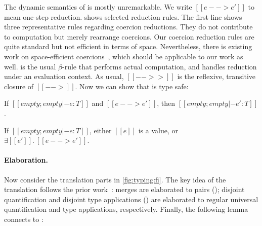 The dynamic semantics of \tnamee is mostly unremarkable. We write $[[e --> e']]$
to mean one-step reduction.  shows selected reduction
rules. The first line shows three representative rules regarding coercion reductions.
They do not contribute to computation but merely rearrange coercions.
Our coercion reduction rules are quite standard but not efficient in terms of
space. Nevertheless, there is existing work on space-efficient
coercions~\citep{Siek_2015, herman2010space}, which should be applicable to our
work as well.  is the usual $\beta$-rule that performs actual
computation, and  handles reduction under an evaluation context.
As usual, $[[-->>]]$ is the reflexive, transitive closure of $[[-->]]$.
Now we can show that \tnamee is type safe:

\begin{theorem}[Preservation]
  If $[[empty; empty |- e : T]]$ and $[[e --> e']]$, then $[[empty; empty |- e' : T]]$.
\end{theorem}

\begin{theorem}[Progress]
  If $[[empty; empty |- e : T]]$, either $[[e]]$ is a value, or $\exists [[e']].\ [[e --> e']]$.
\end{theorem}


\paragraph{Elaboration.}

Now consider the translation parts in \cref{fig:typing:fi}. The key idea of
the translation follows the prior work~\cite{dunfield2014elaborating, oliveira2016disjoint,
  alpuimdisjoint, bi_et_al:LIPIcs:2018:9227}: merges are elaborated to pairs
(); disjoint quantification and disjoint type applications
() are elaborated to regular universal quantification and
type applications, respectively.
Finally, the following lemma connects \fnamee to \tnamee:

